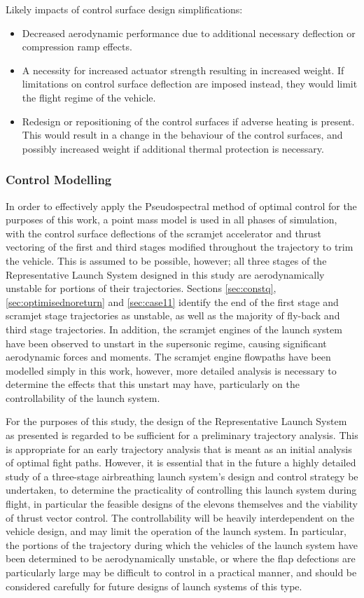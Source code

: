 Likely impacts of control surface design simplifications:
\begin{itemize}[noitemsep,topsep=0pt]
	\item Decreased aerodynamic performance due to additional necessary deflection or compression ramp effects.
	\item A necessity for increased actuator strength resulting in increased weight. If limitations on control surface deflection are imposed instead, they would limit the flight regime of the vehicle. 
	\item Redesign or repositioning of the control surfaces if adverse heating is present. This would result in a change in the behaviour of the control surfaces, and possibly increased weight if additional thermal protection is necessary.
\end{itemize}


\subsubsection{Control Modelling}
In order to effectively apply the Pseudospectral method of optimal control for the purposes of this work, a point mass model is used in all phases of simulation, with the control surface deflections of the scramjet accelerator and thrust vectoring of the first and third stages modified throughout the trajectory to trim the vehicle. This is assumed to be possible, however; all three stages of the Representative Launch System designed in this study are aerodynamically unstable for portions of their trajectories. Sections \ref{sec:constq}, \ref{sec:optimisednoreturn} and \ref{sec:case11}  identify the end of the first stage and scramjet stage trajectories as unstable, as well as the majority of fly-back and third stage trajectories. In addition, the scramjet engines of the launch system have been observed to unstart in the supersonic regime, causing significant aerodynamic forces and moments. The scramjet engine flowpaths have been modelled simply in this work, however, more detailed analysis is necessary to determine the effects that this unstart may have, particularly on the controllability of the launch system. 

For the purposes of this study, the design of the Representative Launch System as presented is regarded to be sufficient for a preliminary trajectory analysis. This is appropriate for an early trajectory analysis that is meant as an initial analysis of optimal fight paths. 
However, it is essential that in the future a highly detailed study of a three-stage airbreathing launch system's design and control strategy be undertaken, to determine the practicality of controlling this launch system during flight, in particular the feasible designs of the elevons themselves and the viability of thrust vector control. The controllability will be heavily interdependent on the vehicle design, and may limit the operation of the launch system. In particular, the portions of the trajectory during which the vehicles of the launch system have been determined to be aerodynamically unstable, or where the flap defections are particularly large may be difficult to control in a practical manner, and should be considered carefully for future designs of launch systems of this type. 

